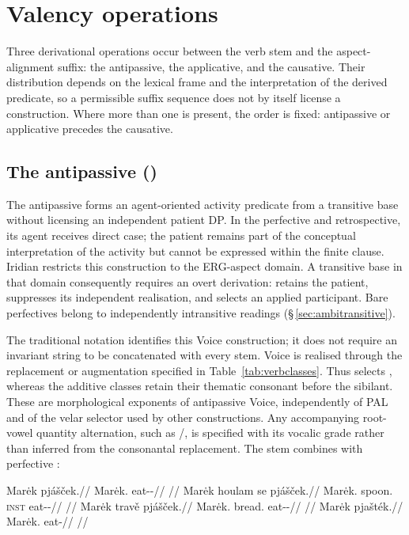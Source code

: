 \section{Valency operations}

Three derivational operations occur between the verb stem and the
aspect-alignment suffix: the antipassive, the applicative, and the causative.
Their distribution depends on the lexical frame and the interpretation of the
derived predicate, so a permissible suffix sequence does not by itself license
a construction. Where more than one is present, the order is fixed:
antipassive or applicative precedes the causative.

\subsection{The antipassive ()}
\label{sec:vm-antipassive-desc}\label{sec:vm-antipassive}

The antipassive  forms an agent-oriented activity predicate from a
transitive base without licensing an independent patient DP. In the perfective
and retrospective, its agent receives direct case; the patient remains part of
the conceptual interpretation of the activity but cannot be expressed within
the finite clause. Iridian restricts this construction to the ERG-aspect domain.
A transitive base in that domain consequently requires an overt derivation:
 retains the patient,  suppresses its independent
realisation, and  selects an applied participant. Bare perfectives
belong to independently intransitive readings (§\,\ref{sec:ambitransitive}).

The traditional notation  identifies this Voice construction;
it does not require an invariant string  to be concatenated with
every stem. Voice is realised through the replacement or augmentation specified
in Table~\ref{tab:verbclasses}. Thus  selects ,
whereas the additive classes retain their thematic consonant before the
sibilant. These are morphological exponents of antipassive Voice, independently
of PAL and of the velar selector used by other constructions. Any accompanying
root-vowel quantity alternation, such as /, is specified
with its vocalic grade rather than inferred from the consonantal replacement.
The stem  combines with perfective :

\pex
\a
\begingl
\gla Marėk pjášček.//
\glb Marėk.\Dir{} eat-\Antip{}-\Pf{}//
\glft {}//
\endgl
\a
\begingl
\gla Marėk houlam se pjášček.//
\glb Marėk.\Dir{} spoon.\Ind{} \textsc{inst} eat-\Antip{}-\Pf{}//
\glft {}//
\endgl
\a
\begingl
\gla *Marėk travě pjášček.//
\glb Marėk.\Dir{} bread.\Ind{} eat-\Antip{}-\Pf{}//
\glft {}//
\endgl
\a
\begingl
\gla *Marėk pjašték.//
\glb Marėk.\Dir{} eat-\Pf{}//
\glft {}//
\endgl
\xe

